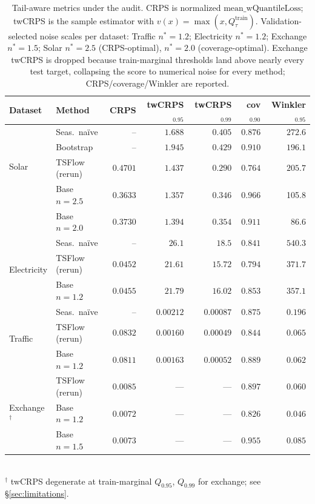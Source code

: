 \documentclass{article}
\begin{document}
\begin{table}[t]
\centering
\caption{Tail-aware metrics under the audit. CRPS is normalized
$\mathrm{mean\_wQuantileLoss}$; twCRPS is the sample estimator with
$v(x) = \max(x, Q_\tau^{\text{train}})$. Validation-selected noise
scales per dataset: Traffic $n^*{=}1.2$; Electricity $n^*{=}1.2$;
Exchange $n^*{=}1.5$; Solar $n^*{=}2.5$ (CRPS-optimal), $n^*{=}2.0$
(coverage-optimal). Exchange twCRPS is dropped because
train-marginal thresholds land above nearly every test target,
collapsing the score to numerical noise for every method;
CRPS/coverage/Winkler are reported.}
\label{tab:tail}
\small
\begin{tabular}{llrrrrr}
\toprule
Dataset & Method & CRPS & twCRPS$_{0.95}$ & twCRPS$_{0.99}$ & cov$_{0.90}$ & Winkler$_{0.95}$\\
\midrule
\multirow{4}{*}{Solar}
  & Seas.\ naïve    & --     & $1.688$ & $0.405$ & $0.876$ & $272.6$ \\
  & Bootstrap       & --     & $1.945$ & $0.429$ & $0.910$ & $196.1$ \\
  & TSFlow (rerun)  & $0.4701$ & $1.437$ & $\mathbf{0.290}$ & $0.764$ & $205.7$ \\
  & Base $n{=}2.5$  & $\mathbf{0.3633}$ & $\mathbf{1.357}$ & $0.346$ & $0.966$ & 105.8 \\
  & Base $n{=}2.0$  & $0.3730$ & $1.394$ & $0.354$ & $\mathbf{0.911}$ & $\mathbf{86.6}$ \\
\midrule
\multirow{3}{*}{Electricity}
  & Seas.\ naïve   & --     & $26.1$ & $18.5$ & $0.841$ & $540.3$ \\
  & TSFlow (rerun) & $\mathbf{0.0452}$ & $\mathbf{21.61}$ & $\mathbf{15.72}$ & $0.794$ & $371.7$ \\
  & Base $n{=}1.2$ & $0.0455$ & $21.79$ & $16.02$ & $\mathbf{0.853}$ & $\mathbf{357.1}$ \\
\midrule
\multirow{3}{*}{Traffic}
  & Seas.\ naïve   & --     & $0.00212$ & $0.00087$ & $0.875$ & $0.196$ \\
  & TSFlow (rerun) & $0.0832$ & $\mathbf{0.00160}$ & $\mathbf{0.00049}$ & $0.844$ & $0.065$ \\
  & Base $n{=}1.2$ & $\mathbf{0.0811}$ & $0.00163$ & $0.00052$ & $\mathbf{0.889}$ & $\mathbf{0.062}$ \\
\midrule
\multirow{3}{*}{Exchange$^\dagger$}
  & TSFlow (rerun) & $0.0085$ & --- & --- & $0.897$ & $\mathbf{0.060}$ \\
  & Base $n{=}1.2$ & $\mathbf{0.0072}$ & --- & --- & $0.826$ & $0.046$ \\
  & Base $n{=}1.5$ & $0.0073$ & --- & --- & $\mathbf{0.955}$ & $0.085$ \\
\bottomrule
\end{tabular}\\
\vspace{0.4em}
{\footnotesize $^\dagger$ twCRPS degenerate at train-marginal
$Q_{0.95}$, $Q_{0.99}$ for exchange; see \S\ref{sec:limitations}.}
\end{table}
\end{document}
